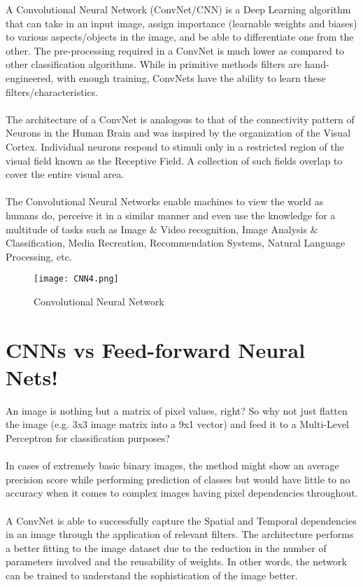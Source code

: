 A Convolutional Neural Network (ConvNet/CNN) is a Deep Learning algorithm that can take in an input image, assign importance (learnable weights and biases) to various aspects/objects in the image, and be able to differentiate one from the other. The pre-processing required in a ConvNet is much lower as compared to other classification algorithms. While in primitive methods filters are hand-engineered, with enough training, ConvNets have the ability to learn these filters/characteristics.
\\ \\
The architecture of a ConvNet is analogous to that of the connectivity pattern of Neurons in the Human Brain and was inspired by the organization of the Visual Cortex. Individual neurons respond to stimuli only in a restricted region of the visual field known as the Receptive Field. A collection of such fields overlap to cover the entire visual area.
\\ \\
The Convolutional Neural Networks enable machines to view the world as humans do, perceive it in a similar manner and even use the knowledge for a multitude of tasks such as Image $\&$ Video recognition, Image Analysis $\&$ Classification, Media Recreation, Recommendation Systems, Natural Language Processing, etc. 

\begin{figure}[h]
    \centering
    \texttt{[image: CNN4.png]}
    \caption{Convolutional Neural Network}
\end{figure}

\section{CNNs vs Feed-forward Neural Nets!}
    An image is nothing but a matrix of pixel values, right? So why not just flatten the image (e.g. 3x3 image matrix into a 9x1 vector) and feed it to a Multi-Level Perceptron for classification purposes?
\\ \\
    In cases of extremely basic binary images, the method might show an average precision score while performing prediction of classes but would have little to no accuracy when it comes to complex images having pixel dependencies throughout.
\\ \\
    A ConvNet is able to successfully capture the Spatial and Temporal dependencies in an image through the application of relevant filters. The architecture performs a better fitting to the image dataset due to the reduction in the number of parameters involved and the reusability of weights. In other words, the network can be trained to understand the sophistication of the image better.

